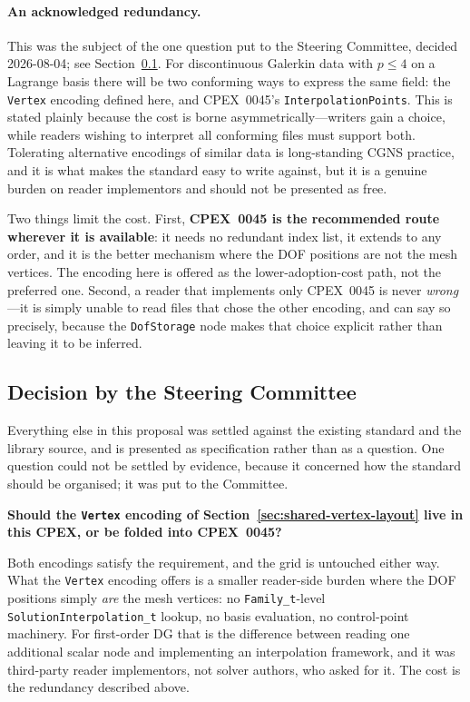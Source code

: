 \documentclass[11pt,letterpaper]{article}
\begin{document}
\paragraph{An acknowledged redundancy.}  This was the subject of the one
question put to the Steering Committee, decided 2026-08-04; see
Section~\ref{sec:decision}.  For discontinuous Galerkin data
with $p \leq 4$ on a Lagrange basis there will be two conforming ways to
express the same field: the \texttt{Vertex} encoding defined here, and
CPEX~0045's \texttt{InterpolationPoints}.  This is stated plainly
because the cost is borne asymmetrically---writers gain a choice, while
readers wishing to interpret all conforming files must support both.
Tolerating alternative encodings of similar data is long-standing CGNS
practice, and it is what makes the standard easy to write against, but
it is a genuine burden on reader implementors and should not be
presented as free.

Two things limit the cost.  First, \textbf{CPEX~0045 is the recommended
route wherever it is available}: it needs no redundant index list, it
extends to any order, and it is the better mechanism where the DOF
positions are not the mesh vertices.  The encoding here is offered as
the lower-adoption-cost path, not the preferred one.  Second, a reader
that implements only CPEX~0045 is never \emph{wrong}---it is simply
unable to read files that chose the other encoding, and can say so
precisely, because the \texttt{DofStorage} node makes that choice
explicit rather than leaving it to be inferred.

\subsection{Decision by the Steering Committee}
\label{sec:decision}

Everything else in this proposal was settled against the existing
standard and the library source, and is presented as specification
rather than as a question.  One question could not be settled by
evidence, because it concerned how the standard should be organised;
it was put to the Committee.

\textbf{Should the \texttt{Vertex} encoding of
Section~\ref{sec:shared-vertex-layout} live in this CPEX, or be folded
into CPEX~0045?}

Both encodings satisfy the requirement, and the grid is untouched either
way.  What the \texttt{Vertex} encoding offers is a smaller reader-side
burden where the DOF positions simply \emph{are} the mesh vertices: no
\texttt{Family\_t}-level \texttt{SolutionInterpolation\_t} lookup, no
basis evaluation, no control-point machinery.  For first-order DG that
is the difference between reading one additional scalar node and
implementing an interpolation framework, and it was third-party reader
implementors, not solver authors, who asked for it.  The cost is the
redundancy described above.
\end{document}
